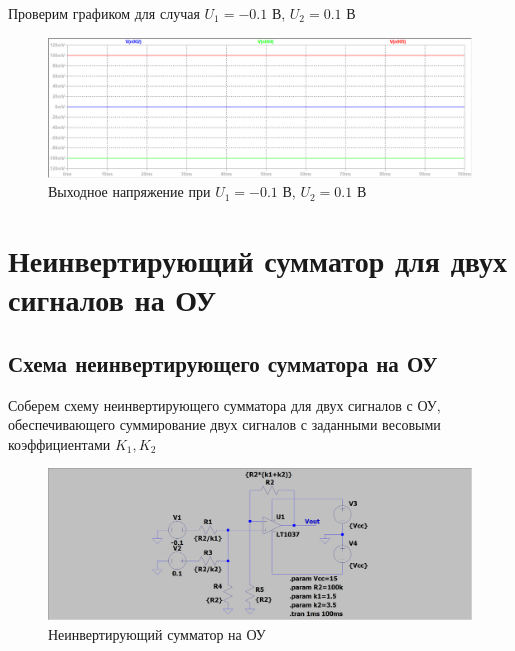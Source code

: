 \documentclass[a4paper, 12pt]{article}
\begin{document}
    Проверим графиком для случая $U_1=-0.1$ В, $U_2=0.1$ В
    \begin{figure}[H]
        \centering
        \includegraphics[scale=0.46]{scheme4_check.png}
        \captionsetup{skip=0pt}
        \caption{Выходное напряжение при $U_1=-0.1$ В, $U_2=0.1$ В}
        \label{fig:scheme4_check}
    \end{figure}


    \section{Неинвертирующий сумматор для двух сигналов на ОУ}
    \subsection{Схема неинвертирующего сумматора на ОУ}
    Соберем схему неинвертирующего сумматора для двух сигналов с ОУ,
    обеспечивающего суммирование двух сигналов с заданными весовыми
    коэффициентами $K_1,K_2$
    \begin{figure}[H]
        \centering
        \includegraphics[scale=0.22]{scheme5.png}
        \captionsetup{skip=0pt}
        \caption{Неинвертирующий сумматор на ОУ}
        \label{fig:scheme5}
    \end{figure}
\end{document}
